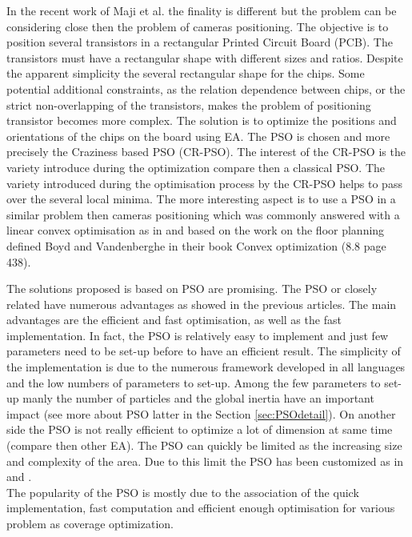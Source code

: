  In the recent work of Maji et al.\cite{143*maji2015} the finality is different but the problem can be considering close then the problem of cameras positioning. 
The objective is to position several transistors in a rectangular Printed Circuit Board (PCB).
The transistors must have a rectangular shape with different sizes and ratios. 
  Despite the apparent simplicity the several rectangular shape for the chips. Some potential additional constraints, as the relation dependence between chips, or the strict non-overlapping of the transistors, makes the problem of positioning transistor becomes more complex. The solution is to optimize the positions and orientations of the chips on the board using EA. The  PSO is chosen and more precisely the Craziness based PSO (CR-PSO). The interest of the CR-PSO is the variety introduce during the optimization compare then a classical PSO. The variety introduced during the optimisation process by the CR-PSO  helps to pass over the several local minima. 
  The more interesting aspect is to use a PSO in a similar problem then cameras positioning which was commonly answered with a linear convex optimisation as in \citep{62*vijayan1991} and  based on the work on the floor planning defined Boyd and Vandenberghe in their book Convex optimization \cite{boyd2004convex}(8.8 page 438).  
  
The solutions proposed is based on PSO are promising. The PSO or closely related have numerous advantages as showed in the previous articles.
 The main advantages are the efficient and fast optimisation, as well as the fast implementation. In fact, the PSO is  relatively easy to implement and just few parameters need to be set-up before to have an efficient result. The simplicity of the implementation is due to the numerous framework developed in all languages and the low numbers of parameters to set-up. Among the  few parameters to set-up manly the number of particles and the global inertia have an important impact (see more about PSO latter in the Section  \ref{sec:PSOdetail}).
  On another side the PSO is not really efficient  to optimize a lot of dimension at same time (compare then other EA). The PSO can quickly be limited as the increasing size and complexity of the area.
   Due to this limit the PSO has been customized as in \citep{143*maji2015}  and \citep{194*fu2010}. \\
The popularity of the PSO is mostly due to the association of the quick implementation, fast computation and efficient enough optimisation for various problem as coverage optimization.
 
